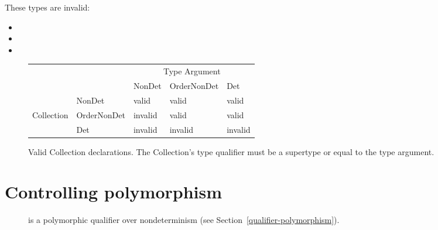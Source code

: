 These types are invalid:
  \begin{itemize}
    \item {}
    \item {}
    \item {}
  \end{itemize}

\begin{figure}
  \centering
  \begin{tabular}{|l|l|l|l|l|}
    \cline{3-5}
    \multicolumn{2}{c|}{~}  &  \multicolumn{3}{c|}{Type Argument} \\ \cline{3-5}
    \multicolumn{2}{c|}{~}  & NonDet     & OrderNonDet & Det \\ \hline
              & NonDet      &   valid    &  valid      & valid  \\ \cline{2-5}
Collection    & OrderNonDet &   invalid  &  valid      & valid  \\ \cline{2-5}
              & Det         &   invalid  &  invalid    & invalid      \\ \hline
  \end{tabular}
  \caption{Valid Collection declarations.  The Collection's type qualifier
    must be a supertype or equal to the type argument.}
  \label{fig-determinism-collections}
\end{figure}





\section{Controlling polymorphism\label{determinism-polymorphism}}

\begin{description}
\item[] is a
  polymorphic qualifier over nondeterminism (see Section~\ref{qualifier-polymorphism}).
\end{description}

